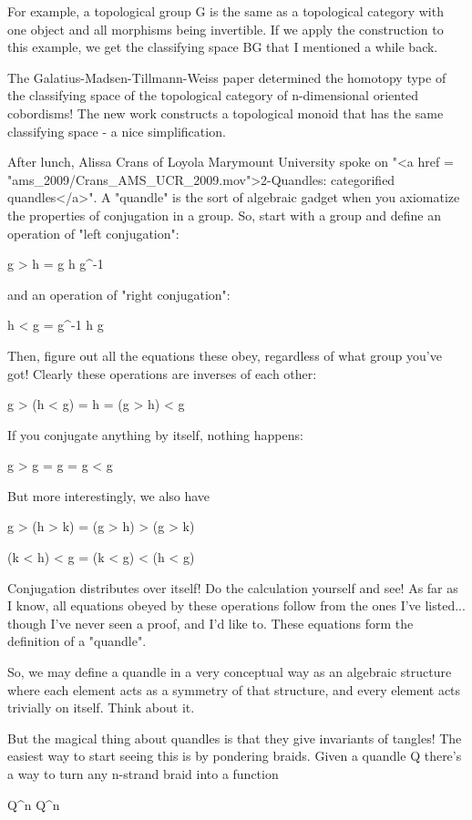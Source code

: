 For example, a topological group G is the same as a topological
category with one object and all morphisms being invertible.  If we
apply the construction to this example, we get the classifying space
BG that I mentioned a while back.

The Galatius-Madsen-Tillmann-Weiss paper determined the homotopy type 
of the classifying space of the topological category of n-dimensional 
oriented cobordisms!  The new work constructs a topological monoid
that has the same classifying space - a nice simplification.   

After lunch, Alissa Crans of Loyola Marymount University spoke on
"<a href = "ams_2009/Crans_AMS_UCR_2009.mov">2-Quandles:
categorified quandles</a>".  A "quandle" is the sort of
algebraic gadget when you axiomatize the properties of conjugation in
a group.  So, start with a group and define an operation of "left
conjugation":

g > h = g h g^{-1}

and an operation of "right conjugation":

h < g = g^{-1} h g

Then, figure out all the equations these obey, regardless of what
group you've got!  Clearly these operations are inverses of
each other:

g > (h < g) = h = (g > h) < g

If you conjugate anything by itself, nothing happens:

g > g = g = g < g

But more interestingly, we also have

g > (h > k) = (g > h) > (g > k)

(k < h) < g = (k < g) < (h < g)

Conjugation distributes over itself!  Do the calculation yourself and
see!  As far as I know, all equations obeyed by these operations
follow from the ones I've listed... though I've never seen a proof,
and I'd like to.  These equations form the definition of a
"quandle".

So, we may define a quandle in a very conceptual way as an algebraic
structure where each element acts as a symmetry of that structure, and
every element acts trivially on itself.  Think about it.

But the magical thing about quandles is that they give invariants of
tangles!  The easiest way to start seeing this is by pondering braids.
Given a quandle Q there's a way to turn any n-strand braid into a
function

Q^{n} \to  Q^{n}

